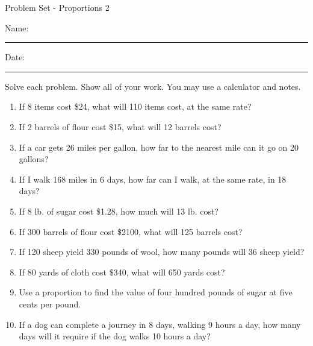 \documentclass[12pt]{article}
\begin{document}
\pagestyle{empty} %
\begin{center}
          Problem Set - Proportions 2\\[0.5in]
\end{center}
Name: \rule{4in}{0.005in} Date: \rule{1.5in}{0.005in} 
  \vspace{0.25in}

Solve each problem. Show all of your work. You may use a calculator and notes. 

\begin{enumerate}

\item If 8 items cost \$24, what will 110 items cost, at the same rate? 
  \vspace{0.5in}

\item If 2 barrels of flour cost \$15, what will 12 barrels cost? 
  \vspace{0.5in}

\item If a car gets 26 miles per gallon, how far to the nearest mile can it go on 20 gallons? 
  \vspace{0.5in}

\item If I walk 168 miles in 6 days, how far can I walk, at the same rate, in 18 days? 
  \vspace{0.5in}

\item If 8 lb. of sugar cost \$1.28, how much will 13 lb. cost? 
  \vspace{0.5in}

\item If 300 barrels of flour cost \$2100, what will 125 barrels cost? 
  \vspace{0.5in}

\item If 120 sheep yield 330 pounds of wool, how many pounds will 36 sheep yield? 
  \vspace{0.5in}

\item If 80 yards of cloth cost \$340, what will 650 yards cost? 
  \vspace{0.5in}

\item Use a proportion to find the value of four hundred pounds of sugar at five cents per pound.  
  \vspace{0.5in}

\item If a dog can complete a journey in 8 days, walking 9 hours a day, how many days will it require if the dog walks 10 hours a day? 
  \vspace{0.5in}


\end{enumerate}
\end{document}
